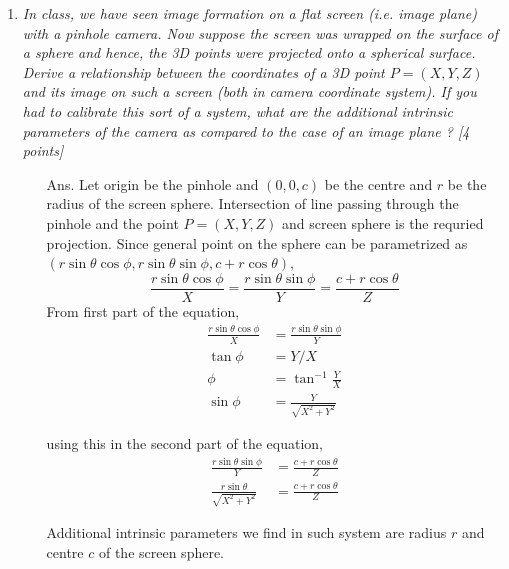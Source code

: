 \documentclass[11pt]{article}
\begin{document}
\maketitle

\begin{enumerate}
\item \textit{In class, we have seen image formation on a flat screen (i.e. image plane) with a pinhole camera. Now suppose the screen was wrapped on the surface of a sphere and hence, the 3D points were projected onto a spherical surface. Derive a relationship between the coordinates of a 3D point $P = (X,Y,Z)$ and its image on such a screen (both in camera coordinate system). If you had to calibrate this sort of a system, what are the additional intrinsic parameters of the camera as compared to the case of an image plane ? \textsf{[4 points]}}
\begin{itemize}
	\item[Ans.] Let origin be the pinhole and $(0,0,c)$ be the centre and $r$ be the radius of the screen sphere. Intersection of line passing through the pinhole and the point $P = (X,Y,Z)$ and screen sphere is the requried projection.
	Since general point on the sphere can be parametrized as $(r\sin{\theta}\cos{\phi}, r\sin{\theta}\sin{\phi}, c+r\cos{\theta})$,
	\[	\frac{r\sin{\theta}\cos{\phi}}{X} = \frac{r\sin{\theta}\sin{\phi}}{Y} = \frac{c+r\cos{\theta}}{Z}
	\]
	From first part of the equation,
	\begin{align*}
		\frac{r\sin{\theta}\cos{\phi}}{X} &= \frac{r\sin{\theta}\sin{\phi}}{Y}\\
		\tan{\phi} &= Y/X  \\
		\phi &= \tan ^{-1}{\frac{Y}{X}} \\
		\sin{\phi} &= \frac{Y}{\sqrt{X^2+Y^2}}
	\end{align*}

	using this in the second part of the equation,
	\begin{align*}
		\frac{r\sin{\theta}\sin{\phi}}{Y} &= \frac{c+r\cos{\theta}}{Z}\\
		\frac{r\sin{\theta}}{\sqrt{X^2+Y^2}} &= \frac{c+r\cos{\theta}}{Z}
	\end{align*}

	Additional intrinsic parameters we find in such system are radius $r$ and centre $c$ of the screen sphere.
\end{itemize}



\end{enumerate}
\end{document}
